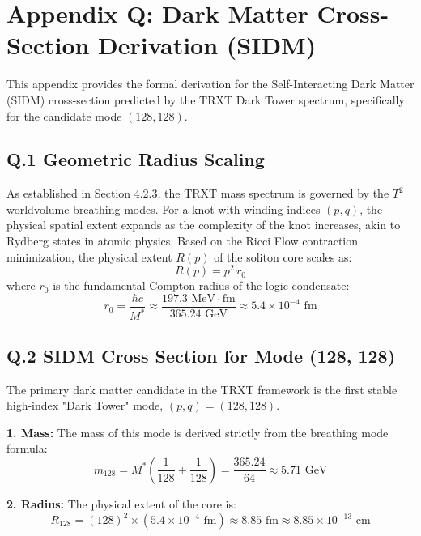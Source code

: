 \section{Appendix Q: Dark Matter Cross-Section Derivation (SIDM)}
\label{app:sidm_cross_section}

This appendix provides the formal derivation for the Self-Interacting Dark Matter (SIDM) cross-section predicted by the TRXT Dark Tower spectrum, specifically for the candidate mode $(128, 128)$.

\subsection{Q.1 Geometric Radius Scaling}
As established in Section 4.2.3, the TRXT mass spectrum is governed by the $T^2$ worldvolume breathing modes. For a knot with winding indices $(p, q)$, the physical spatial extent expands as the complexity of the knot increases, akin to Rydberg states in atomic physics. 
Based on the Ricci Flow contraction minimization, the physical extent $R(p)$ of the soliton core scales as:
\begin{equation}
    R(p) = p^2 \, r_0
\end{equation}
where $r_0$ is the fundamental Compton radius of the logic condensate:
\begin{equation}
    r_0 = \frac{\hbar c}{M^*} \approx \frac{197.3 \text{ MeV}\cdot\text{fm}}{365.24 \text{ GeV}} \approx 5.4 \times 10^{-4} \text{ fm}
\end{equation}

\subsection{Q.2 SIDM Cross Section for Mode (128, 128)}
The primary dark matter candidate in the TRXT framework is the first stable high-index "Dark Tower" mode, $(p,q) = (128, 128)$.

\textbf{1. Mass:}
The mass of this mode is derived strictly from the breathing mode formula:
\begin{equation}
    m_{128} = M^* \left( \frac{1}{128} + \frac{1}{128} \right) =\frac{365.24}{64} \approx 5.71 \text{ GeV}
\end{equation}

\textbf{2. Radius:}
The physical extent of the core is:
\begin{equation}
    R_{128} = (128)^2 \times (5.4 \times 10^{-4} \text{ fm}) \approx 8.85 \text{ fm} \approx 8.85 \times 10^{-13} \text{ cm}
\end{equation}

